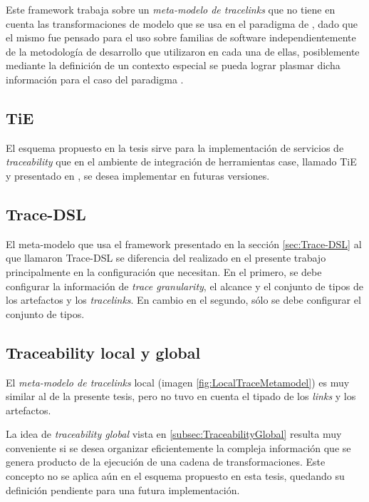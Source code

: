\documentclass[a4paper,12pt,twoside,spanish,openright]{book}
\begin{document}
Este framework trabaja sobre un \textit{meta-modelo de tracelinks} que no tiene en cuenta las transformaciones de modelo que se usa en el paradigma de , dado que el mismo fue pensado para el uso sobre familias de software independientemente de la metodología de desarrollo que utilizaron en cada una de ellas, posiblemente mediante la definición de un contexto especial se pueda lograr plasmar dicha información para el caso del paradigma .


\subsection*{TiE}

El esquema propuesto en la tesis sirve para la implementación de servicios de \textit{traceability} que en el ambiente de integración de herramientas \gls{case}, llamado \textsf{TiE} y presentado en \cite{KlarRoseSchurr}, se desea implementar en futuras versiones.


\subsection*{Trace-DSL}

El meta-modelo que usa el framework presentado en la sección \ref{sec:Trace-DSL} al que llamaron \textsf{Trace-DSL} se diferencia del realizado en el presente trabajo principalmente en la configuración que necesitan. En el primero, se debe configurar la información de \textit{trace granularity}, el alcance y el conjunto de tipos de los artefactos y los \textit{tracelinks}. En cambio en el segundo, sólo se debe configurar el conjunto de tipos.


\subsection*{Traceability local y global}

El \textit{meta-modelo de tracelinks} local (imagen \ref{fig:LocalTraceMetamodel}) es muy similar al de la presente tesis, pero no tuvo en cuenta el tipado de los \textit{links} y los artefactos. 

La idea de \textit{traceability global} vista en \ref{subsec:TraceabilityGlobal} resulta muy conveniente si se desea organizar eficientemente la compleja información que se genera producto de la ejecución de una cadena de transformaciones. Este concepto no se aplica aún en el esquema propuesto en esta tesis, quedando su definición pendiente para una futura implementación.
\end{document}

